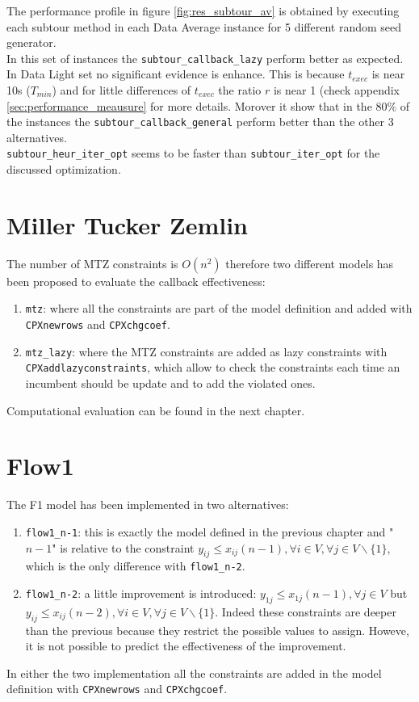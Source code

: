 The performance profile in figure \ref{fig:res_subtour_av} is obtained by executing each subtour method in each Data Average instance for 5 different random seed generator. \\
In this set of instances the \texttt{subtour\_callback\_lazy} perform better as expected. In Data Light set no significant evidence is enhance. This is because $ t_{exec} $ is near 10s ($ T_{min} $) and for little differences of $ t_{exec} $ the ratio $ r $ is near 1 (check appendix \ref{sec:performance_meausure} for more details.
Morover it show that in the $ 80\%  $  of the instances the \texttt{subtour\_callback\_general} perform better than the other 3 alternatives.\\
\texttt{subtour\_heur\_iter\_opt} seems to be faster than \texttt{subtour\_iter\_opt} for the discussed optimization. 


\section{Miller Tucker Zemlin}
The number of MTZ constraints is $O(n^2)$ therefore two different models has been proposed to evaluate the callback effectiveness:
\begin{enumerate}
	\item \texttt{mtz}: where all the constraints are part of the model definition and added with \texttt{CPXnewrows} and \texttt{CPXchgcoef}. 
	\item \texttt{mtz\_lazy}: where the MTZ constraints are added as lazy constraints with \texttt{CPXaddlazyconstraints}, which allow to check the constraints each time an incumbent should be update and to add the violated ones.
\end{enumerate}

Computational evaluation can be found in the next chapter.

\section{Flow1}
The F1 model has been implemented in two alternatives:
\begin{enumerate}
	\item \texttt{flow1\_n-1}: this is exactly the model defined in the previous chapter and "$ n-1 $" is relative to the constraint  $ y_{ij} \leq x_{ij} (n-1), \forall i \in V, \forall j \in V \backslash \{1\} $, which is the only difference with \texttt{flow1\_n-2}. 
	\item \texttt{flow1\_n-2}: a little improvement is introduced: $ y_{1j} \leq x_{1j}  (n-1), \forall j \in V $ but $ y_{ij} \leq x_{ij} (n-2), \forall i \in V, \forall j \in V \backslash \{1\} $. Indeed these constraints are deeper than the previous because they restrict the possible values to assign. Howeve, it is not possible to predict the effectiveness of the improvement.
\end{enumerate}
In either the two implementation all the constraints are added in the model definition with \texttt{CPXnewrows} and \texttt{CPXchgcoef}.

